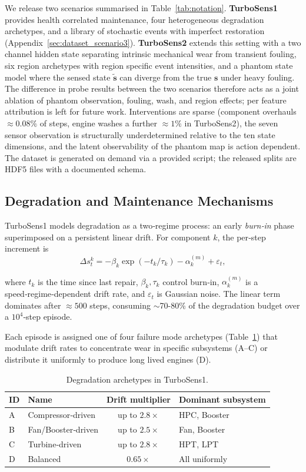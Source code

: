 \documentclass{article}
\begin{document}
We release two scenarios summarised in Table~\ref{tab:notation}. \textbf{TurboSens1} provides health correlated maintenance, four heterogeneous degradation archetypes, and a library of stochastic events with imperfect restoration (Appendix~\ref{sec:dataset_scenario3}). \textbf{TurboSens2} extends this setting with a two channel hidden state separating intrinsic mechanical wear from transient fouling, six region archetypes with region specific event intensities, and a phantom state model where the sensed state $\tilde{\mathbf{s}}$ can diverge from the true $\mathbf{s}$ under heavy fouling. The difference in probe results between the two scenarios therefore acts as a joint ablation of phantom observation, fouling, wash, and region effects; per feature attribution is left for future work. Interventions are sparse (component overhauls $\approx 0.08\%$ of steps, engine washes a further $\approx 1\%$ in TurboSens2), the seven sensor observation is structurally underdetermined relative to the ten state dimensions, and the latent observability of the phantom map is action dependent. The dataset is generated on demand via a provided script; the released splits are HDF5 files with a documented schema.


\subsection{Degradation and Maintenance Mechanisms}

TurboSens1 models degradation as a two‑regime process: an early \textit{burn‑in} phase superimposed on a persistent linear drift. For component $k$, the per‑step increment is
\begin{equation}
  \Delta s_t^k = -\beta_k \exp(-t_k/\tau_k) - \alpha_k^{(m)} + \varepsilon_t,
\end{equation}

where $t_k$ is the time since last repair, $\beta_k,\tau_k$ control burn‑in, $\alpha_k^{(m)}$ is a speed‑regime‑dependent drift rate, and $\varepsilon_t$ is Gaussian noise. The linear term dominates after $\approx 500$ steps, consuming $\sim$70-80\% of the degradation budget over a $10^4$‑step episode.

Each episode is assigned one of four failure mode archetypes (Table~\ref{tab:archetypes}) that modulate drift rates to concentrate wear in specific subsystems (A--C) or distribute it uniformly to produce long lived engines (D).

\begin{table}[h]
\centering
\caption{Degradation archetypes in TurboSens1.}
\label{tab:archetypes}
\small
\begin{tabular}{llcl}
\toprule
ID & Name & Drift multiplier & Dominant subsystem \\
\midrule
A & Compressor‑driven & up to $2.8\times$ & HPC, Booster \\
B & Fan/Booster‑driven & up to $2.5\times$ & Fan, Booster \\
C & Turbine‑driven    & up to $2.8\times$ & HPT, LPT \\
D & Balanced          & $0.65\times$ & All uniformly \\
\bottomrule
\end{tabular}
\end{table}
\end{document}

